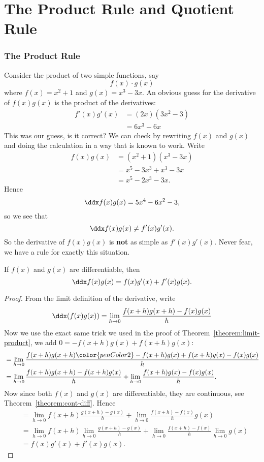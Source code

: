 \chapter{The Product Rule and Quotient Rule}

\subsection{The Product Rule}

Consider the product of two simple functions, say
\[
f(x)\cdot g(x)
\]
where $f(x)=x^2+1$ and $g(x)=x^3-3x$. An obvious guess for the
derivative of $f(x)g(x)$ is the product of the derivatives:
\begin{align*}
f'(x)g'(x) &= (2x)(3x^2-3)\\
&= 6x^3-6x
\end{align*}
This was our guess, is it correct? We can check by rewriting $f(x)$
and $g(x)$ and doing the calculation in a way that is known to
work. Write 
\begin{align*}
f(x)g(x) &= (x^2+1)(x^3-3x)\\
&=x^5-3x^3+x^3-3x\\
&=x^5-2x^3-3x.
\end{align*} 
Hence
\[
\ddx f(x) g(x) = 5x^4-6x^2-3, 
\]
so we see that 
\[
\ddx f(x) g(x) \ne  f'(x)g'(x).
\]
So the derivative of $f(x)g(x)$ is \textbf{not} as simple as
$f'(x)g'(x)$. Never fear, we have a rule for exactly this
situation.
\begin{theorem}
If $f(x)$ and $g(x)$ are differentiable, then
\[
\ddx f(x)g(x) = f(x)g'(x)+f'(x)g(x).
\]
\end{theorem}

\begin{proof}
From the limit definition of the derivative, write
\[
\ddx (f(x)g(x)) = \lim_{h \to0} \frac{f(x+h)g(x+h) - f(x)g(x)}{h}
\]
Now we use the exact same trick we used in the proof of
Theorem~\ref{theorem:limit-product}, we add $0 = -f(x+h)g(x) + f(x+h)g(x)$:
\begin{align*}
&=\lim_{h \to0} \frac{f(x+h)g(x+h){\color{penColor2}-f(x+h)g(x) + f(x+h)g(x)}- f(x)g(x)}{h} \\ 
&=\lim_{h \to0} \frac{f(x+h)g(x+h)-f(x+h)g(x)}{h} + \lim_{h \to0} \frac{f(x+h)g(x)- f(x)g(x)}{h}.
\end{align*}
Now since both $f(x)$ and $g(x)$ are differentiable, they are
continuous, see Theorem~\ref{theorem:cont-diff}. Hence
\begin{align*}
&=\lim_{h \to0} f(x+h)\frac{g(x+h)-g(x)}{h} + \lim_{h \to0} \frac{f(x+h)- f(x)}{h}g(x) \\ 
&=\lim_{h \to0} f(x+h)\lim_{h \to0}\frac{g(x+h)-g(x)}{h} + \lim_{h \to0} \frac{f(x+h)- f(x)}{h}\lim_{h \to0}g(x) \\ 
&=f(x)g'(x) + f'(x)g(x).
\end{align*}
\end{proof}



